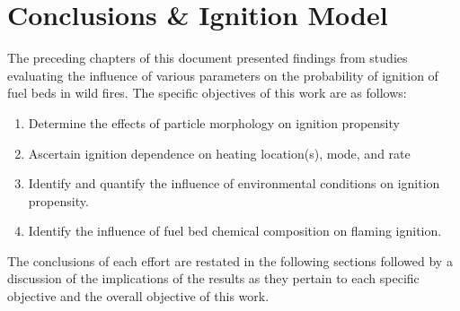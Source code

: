 
\chapter{Conclusions \& Ignition Model}
\label{chap:conclusion}
The preceding chapters of this document presented findings from studies evaluating the influence of various parameters on the probability of ignition of fuel beds in wild fires. The specific objectives of this work are as follows:
        \begin{enumerate}
            \item Determine the effects of particle morphology on ignition propensity
            \item Ascertain ignition dependence on heating location(s), mode, and rate
            \item Identify and quantify the influence of environmental conditions on ignition propensity.
            \item Identify the influence of fuel bed chemical composition on flaming ignition.
        \end{enumerate}
The conclusions of each effort are restated in the following sections followed by a discussion of the implications of the results as they pertain to each specific objective and the overall objective of this work.

